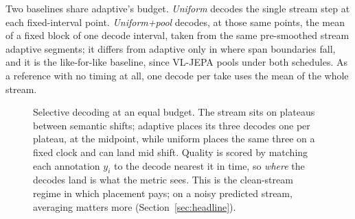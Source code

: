 \documentclass[journal]{IEEEtran}
\begin{document}
Two baselines share adaptive's budget. \emph{Uniform} decodes the single stream
step at each fixed-interval point. \emph{Uniform+pool} decodes, at those same
points, the mean of a fixed block of one decode interval, taken from the same
pre-smoothed stream adaptive segments; it differs from adaptive only in where span
boundaries fall, and it is the like-for-like baseline, since VL-JEPA pools under
both schedules. As a reference with no timing at all, one decode per take uses the
mean of the whole stream.

\begin{figure}[t]
\centering
{}
\caption{Selective decoding at an equal budget. The stream sits on plateaus
between semantic shifts; adaptive places its three decodes one per plateau, at the
midpoint, while uniform places the same three on a fixed clock and can land mid
shift. Quality is scored by matching each annotation $y_i$ to the decode nearest
it in time, so \emph{where} the decodes land is what the metric sees. This is the
clean-stream regime in which placement pays; on a noisy predicted stream,
averaging matters more (Section~\ref{sec:headline}).}
\label{fig:idea}
\end{figure}
\end{document}

